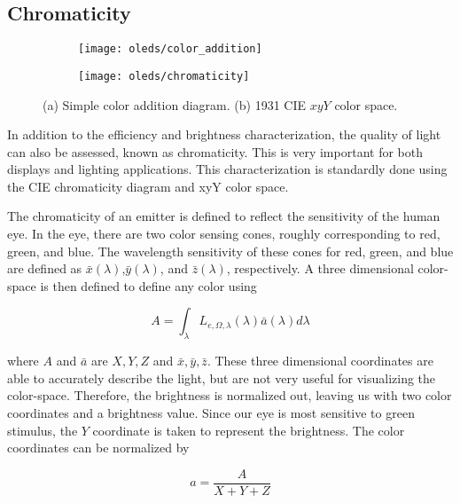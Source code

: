 \documentclass[../thesis.tex]{subfiles}
\begin{document}
\subsection{Chromaticity}\label{sec:chromaticity}
\begin{figure}[ht]
\centering
\begin{subfigure}{.4\textwidth}
\texttt{[image: oleds/color\_addition]}
\caption{}
\label{fig:oleds_color_addition}
\end{subfigure}
\begin{subfigure}{.4\textwidth}
\texttt{[image: oleds/chromaticity]}
\caption{}
\label{fig:oleds_cie}
\end{subfigure}
\caption{(a) Simple color addition diagram. (b) 1931 CIE $xyY$ color space.}
\end{figure}
In addition to the efficiency and brightness characterization, the quality of light can also be assessed, known as chromaticity.
This is very important for both displays and lighting applications.
This characterization is standardly done using the CIE chromaticity diagram and xyY color space.\supercite{Smith1931,Wright1929,Guild1932}

The chromaticity of an emitter is defined to reflect the sensitivity of the human eye.
In the eye, there are two color sensing cones, roughly corresponding to red, green, and blue.
The wavelength sensitivity of these cones for red, green, and blue are defined as $\bar{x}(\lambda)$,$\bar{y}(\lambda)$, and $\bar{z}(\lambda)$, respectively.
A three dimensional color-space is then defined to define any color using

\begin{equation}
A=\int_\lambda L_{e,\Omega,\lambda}(\lambda)\bar{a}(\lambda)d\lambda
\label{oleds_tristimulus}
\end{equation}

where $A$ and $\bar{a}$ are $X,Y,Z$ and $\bar{x},\bar{y},\bar{z}$.
These three dimensional coordinates are able to accurately describe the light, but are not very useful for visualizing the color-space.
Therefore, the brightness is normalized out, leaving us with two color coordinates and a brightness value.
Since our eye is most sensitive to green stimulus, the $Y$ coordinate is taken to represent the brightness.
The color coordinates can be normalized by

\begin{equation}
a=\frac{A}{X+Y+Z}
\label{oleds_color_coordinates}
\end{equation}
\end{document}
